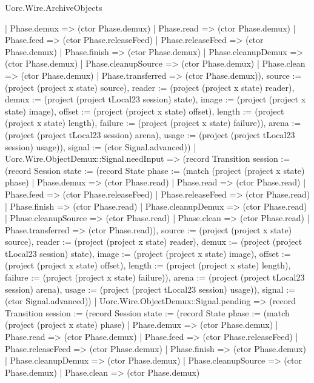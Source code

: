 \begin{lexlean}{Uorc.Wire.ArchiveObjects}
\begin{semanticmodule}
{{{{            | Phase.demux => (ctor Phase.demux)
            | Phase.read => (ctor Phase.demux)
            | Phase.feed => (ctor Phase.releaseFeed)
            | Phase.releaseFeed => (ctor Phase.demux)
            | Phase.finish => (ctor Phase.demux)
            | Phase.cleanupDemux => (ctor Phase.demux)
            | Phase.cleanupSource => (ctor Phase.demux)
            | Phase.clean => (ctor Phase.demux)
            | Phase.transferred => (ctor Phase.demux)), source := (project (project x state) source), reader := (project (project x state) reader), demux := (project (project tLocal23 session) state), image := (project (project x state) image), offset := (project (project x state) offset), length := (project (project x state) length), failure := (project (project x state) failure)}), arena := (project (project tLocal23 session) arena), usage := (project (project tLocal23 session) usage)}), signal := (ctor Signal.advanced)})
          | Uorc.Wire.ObjectDemux::Signal.needInput => (record Transition {session := (record Session {state := (record State {phase := (match (project (project x state) phase)
            | Phase.demux => (ctor Phase.read)
            | Phase.read => (ctor Phase.read)
            | Phase.feed => (ctor Phase.releaseFeed)
            | Phase.releaseFeed => (ctor Phase.read)
            | Phase.finish => (ctor Phase.read)
            | Phase.cleanupDemux => (ctor Phase.read)
            | Phase.cleanupSource => (ctor Phase.read)
            | Phase.clean => (ctor Phase.read)
            | Phase.transferred => (ctor Phase.read)), source := (project (project x state) source), reader := (project (project x state) reader), demux := (project (project tLocal23 session) state), image := (project (project x state) image), offset := (project (project x state) offset), length := (project (project x state) length), failure := (project (project x state) failure)}), arena := (project (project tLocal23 session) arena), usage := (project (project tLocal23 session) usage)}), signal := (ctor Signal.advanced)})
          | Uorc.Wire.ObjectDemux::Signal.pending => (record Transition {session := (record Session {state := (record State {phase := (match (project (project x state) phase)
            | Phase.demux => (ctor Phase.demux)
            | Phase.read => (ctor Phase.demux)
            | Phase.feed => (ctor Phase.releaseFeed)
            | Phase.releaseFeed => (ctor Phase.demux)
            | Phase.finish => (ctor Phase.demux)
            | Phase.cleanupDemux => (ctor Phase.demux)
            | Phase.cleanupSource => (ctor Phase.demux)
            | Phase.clean => (ctor Phase.demux)
}}}}
\end{semanticmodule}
\end{lexlean}
